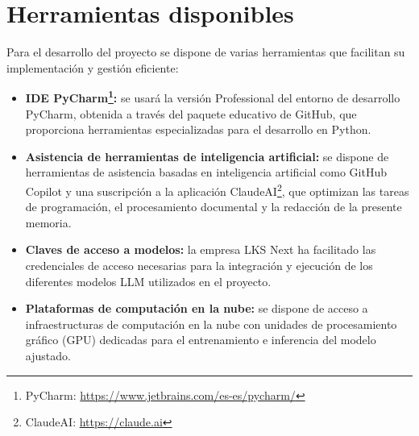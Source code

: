\section{Herramientas disponibles}
Para el desarrollo del proyecto se dispone de varias herramientas que facilitan su implementación y gestión eficiente:
\begin{itemize}
\item\textbf{IDE PyCharm\footnote{PyCharm: \url{https://www.jetbrains.com/es-es/pycharm/}}: }se usará la versión Professional del entorno de desarrollo PyCharm, obtenida a través del paquete educativo de GitHub, que proporciona herramientas especializadas para el desarrollo en Python.
\item\textbf{Asistencia de herramientas de inteligencia artificial: }se dispone de herramientas de asistencia basadas en inteligencia artificial como GitHub Copilot y una suscripción a la aplicación ClaudeAI\footnote{ClaudeAI: \url{https://claude.ai}}, que optimizan las tareas de programación, el procesamiento documental y la redacción de la presente memoria.
\item\textbf{Claves de acceso a modelos: }la empresa LKS Next ha facilitado las credenciales de acceso necesarias para la integración y ejecución de los diferentes modelos LLM utilizados en el proyecto.
\item\textbf{Plataformas de computación en la nube: }se dispone de acceso a infraestructuras de computación en la nube con unidades de procesamiento gráfico (GPU) dedicadas para el entrenamiento e inferencia del modelo ajustado.
\end{itemize}












